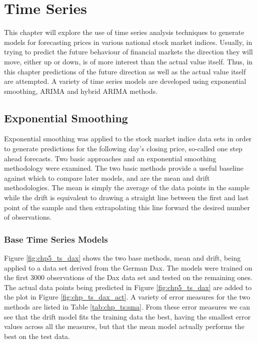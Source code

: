 
\chapter{Time Series} %

\label{Chapter5} %



This chapter will explore the use of time series analysis techniques to generate models for forecasting prices in various national stock market indices. Usually, in trying to predict the future behaviour of financial markets the direction they will move, either up or down, is of more interest than the actual value itself. Thus, in this chapter predictions of the future direction as well as the actual value itself are attempted.  A variety of time series models are developed using exponential smoothing, ARIMA and hybrid ARIMA methods.

\section{Exponential Smoothing}

Exponential smoothing was applied to the stock market indice data sets in order to generate predictions for the following day's closing price, so-called one step ahead forecasts. Two basic approaches and an exponential smoothing methodology were examined. The two basic methods provide a useful baseline against which to compare later models, and are the mean and drift methodologies. The mean is simply the average of the data points in the sample while the drift is equivalent to drawing a straight line between the first and last point of the sample and then extrapolating this line forward the desired number of observations.

\subsection{Base Time Series Models}
Figure \ref{fig:chp5_ts_dax} shows the two base methods, mean and drift, being applied to a data set derived from the German Dax. The models were trained on the first 3000 observations of the Dax data set and tested on the remaining ones. The actual data points being predicted in Figure \ref{fig:chp5_ts_dax} are added to the plot in Figure \ref{fig:chp_ts_dax_act}. A variety of error measures for the two methods are listed in Table \ref{tab:chp_ts:sma}. From these error measures we can see that the drift model fits the training data the best, having the smallest error values across all the measures, but that the mean model actually performs the best on the test data.

